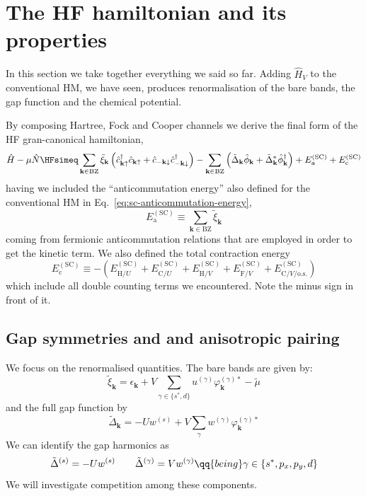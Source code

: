 \section{The HF hamiltonian and its properties}\label{sec:sc-hf-hamiltonian}

In this section we take together everything we said so far. Adding $\hat H_V$ to the conventional HM, we have seen, produces renormalisation of the bare bands, the gap function and the chemical potential. 

By composing Hartree, Fock and Cooper channels we derive the final form of the HF gran-canonical hamiltonian,
\[
	\hat H - \mu \hat N \HFsimeq \sum_{\mathbf{k}\in\mathrm{BZ}} \tilde{\xi}_\mathbf{k} \left(
		\hat c_{\mathbf{k}\uparrow}^\dagger
		\hat c_{\mathbf{k}\uparrow} +
		\hat c_{-\mathbf{k}\downarrow}
		\hat c_{-\mathbf{k}\downarrow}^\dagger
	\right) - \sum_{\mathbf{k}\in\mathrm{BZ}} \left(
		\tilde{\Delta}_\mathbf{k}
		\hat \phi_\mathbf{k} + \tilde{\Delta}_\mathbf{k}^* \hat \phi_\mathbf{k}^\dagger
	\right) + E_\mathrm{a}^{(\mathrm{SC})} + E_\mathrm{c}^{(\mathrm{SC})}	
\]
having we included the ``anticommutation energy'' also defined for the conventional HM in Eq.~\eqref{eq:sc-anticommutation-energy},
\[
	E_\mathrm{a}^{(\mathrm{SC})} \equiv \sum_{\mathbf{k}\in\mathrm{BZ}} \tilde{\xi}_\mathbf{k}
\]
coming from fermionic anticommutation relations that are employed in order to get the kinetic term. We also defined the total contraction energy
\[
	E_\mathrm{c}^{(\mathrm{SC})} \equiv -
	\left(
	E_{\mathrm{H}/U}^{(\mathrm{SC})} +		E_{\mathrm{C}/U}^{(\mathrm{SC})} +
	E_{\mathrm{H}/V}^{(\mathrm{SC})} + E_{\mathrm{F}/V}^{(\mathrm{SC})} + E_{\mathrm{C}/V/\mathrm{o.s.}}^{(\mathrm{SC})}
	\right)
\]
which include all double counting terms we encountered. Note the minus sign in front of it.

\subsection{Gap symmetries and and anisotropic pairing}\label{sec:sc-gap-syms}

We focus on the renormalised quantities. The bare bands are given by:
\begin{equation}\label{eq:sc-ehm-full-bands}
	\tilde{\xi}_\mathbf{k} = \epsilon_\mathbf{k} + V \sum_{\gamma\in\lbrace s^*,d \rbrace} u^{(\gamma)} \varphi_{\mathbf{k}}^{(\gamma)*} - \tilde{\mu}
\end{equation}
and the full gap function by
\begin{equation}\label{eq:sc-ehm-full-gap}
	\tilde{\Delta}_\mathbf{k} = -Uw^{(s)} + V \sum_{\gamma} w^{(\gamma)} \varphi_\mathbf{k}^{(\gamma)*}
\end{equation}
We can identify the gap harmonics as
\[
	\tilde{\Delta}^{(s)} = -U w^{(s)}
	\qquad
	\tilde{\Delta}^{(\gamma)} = V w^{(\gamma)}
	\qq{being}
	\gamma\in\lbrace s^*, p_x, p_y, d \rbrace
\]
We will investigate competition among these components.

